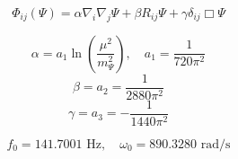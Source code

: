 
\[
\Phi_{ij}(\Psi) = \alpha \nabla_i\nabla_j \Psi + \beta R_{ij} \Psi + \gamma \delta_{ij} \Box\Psi
\]

\[
\alpha = a_1 \ln\left(\frac{\mu^2}{m_\Psi^2}\right), \quad a_1 = \frac{1}{720 \pi^{2}}
\]
\[
\beta = a_2 = \frac{1}{2880 \pi^{2}}
\]
\[
\gamma = a_3 = - \frac{1}{1440 \pi^{2}}
\]

\[
f_0 = 141.7001 \text{ Hz}, \quad \omega_0 = 890.3280 \text{ rad/s}
\]
